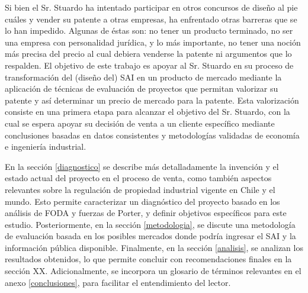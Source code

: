 Si bien el Sr. Stuardo ha intentado participar en otros concursos de diseño al pie cuáles y vender su patente a otras empresas, ha enfrentado otras barreras que se lo han impedido. Algunas de éstas son: no tener un producto terminado, no ser una empresa con personalidad jurídica, y lo más importante, no tener una noción más precisa del precio al cual debiera venderse la patente ni argumentos que lo respalden. El objetivo de este trabajo es apoyar al Sr. Stuardo en su proceso de transformación del (diseño del) SAI en un producto de mercado mediante la aplicación de técnicas de evaluación de proyectos que permitan valorizar su patente y así determinar un precio de mercado para la patente. Esta valorización consiste en una primera etapa para alcanzar el objetivo del Sr. Stuardo, con la cual se espera apoyar su decisión de venta a un cliente específico mediante conclusiones basadas en datos consistentes y metodologías validadas de economía e ingeniería industrial.

En la sección \ref{diagnostico} se describe más detalladamente la invención y el estado actual del proyecto en el proceso de venta, como también aspectos relevantes sobre la regulación de propiedad industrial vigente en Chile y el mundo. Esto permite caracterizar un diagnóstico del proyecto basado en los análisis de FODA y fuerzas de Porter, y definir objetivos específicos para este estudio. Posteriormente, en la sección \ref{metodologia}, se discute una metodología de evaluación basada en los posibles mercados donde podría ingresar el SAI y la información pública disponible. Finalmente, en la sección \ref{analisis}, se analizan los resultados obtenidos, lo que permite concluir con recomendaciones finales en la sección XX. Adicionalmente, se incorpora un glosario de términos relevantes en el anexo \ref{conclusiones}, para facilitar el entendimiento del lector.
